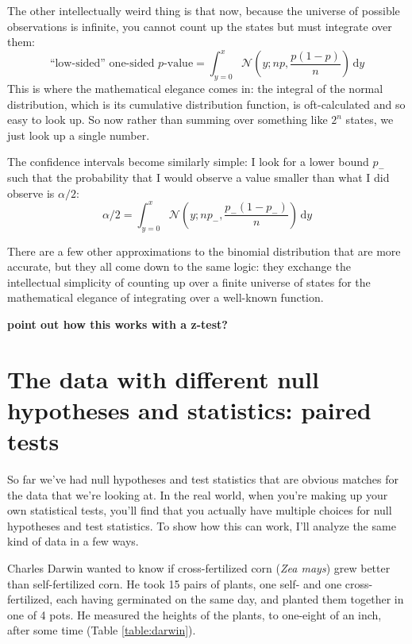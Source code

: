 The other intellectually weird thing is that now, because the universe of possible observations is infinite, you cannot count up the states but must integrate over them:
\begin{equation}
    \text{``low-sided'' one-sided $p$-value} = \int_{y=0}^x \mathcal{N}\left(y; np, \frac{p(1-p)}{n} \right) \,\mathrm{d}y
\end{equation}
This is where the mathematical elegance comes in: the integral of the normal distribution, which is its cumulative distribution function, is oft-calculated and so easy to look up. So now rather than summing over something like $2^n$ states, we just look up a single number.

The confidence intervals become similarly simple: I look for a lower bound $p_-$ such that the probability that I would observe a value smaller than what I did observe is $\alpha/2$:
\begin{equation}
    \alpha/2 = \int_{y=0}^x \mathcal{N} \left(y; np_-, \frac{p_-(1-p_-)}{n} \right) \,\mathrm{d}y
\end{equation}

There are a few other approximations to the binomial distribution that are more
accurate, but they all come down to the same logic: they exchange the
intellectual simplicity of counting up over a finite universe of states for the
mathematical elegance of integrating over a well-known function.

\textbf{point out how this works with a z-test?}

\section{The data with different null hypotheses and statistics: paired tests}

So far we've had null hypotheses and test statistics that are obvious matches for the data that we're looking at. In the real world, when you're making up your own statistical tests, you'll find that you actually have multiple choices for null hypotheses and test statistics. To show how this can work, I'll analyze the same kind of data in a few ways.

Charles Darwin wanted to know if cross-fertilized corn (\textit{Zea mays}) grew better than self-fertilized corn. He took 15 pairs of plants, one self- and one cross-fertilized, each having germinated on the same day, and planted them together in one of 4 pots. He measured the heights of the plants, to one-eight of an inch, after some time (Table \ref{table:darwin}).

